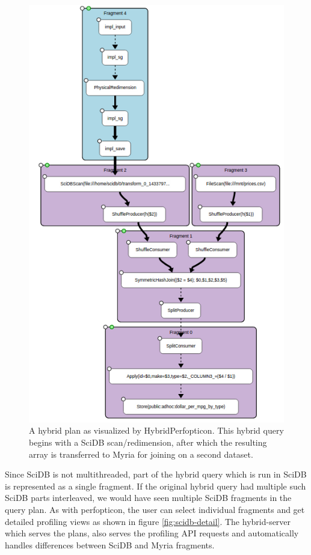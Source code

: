 \documentclass{chi2009}
\begin{document}
\begin{figure}[h]
\begin{center}
\includegraphics[scale=0.4]{visualization-example.png}
\end{center}
\caption{A hybrid plan as visualized by HybridPerfopticon.  This hybrid query begins with a SciDB scan/redimension, after which the resulting array is transferred to Myria for joining on a second dataset.}
\label{fig:hybrid-visualization}
\end{figure}
Since SciDB is not multithreaded, part of the hybrid query which is run in SciDB is represented as a single fragment. If the original hybrid query had multiple such SciDB parts interleaved, we would have seen multiple SciDB fragments in the query plan. As with perfopticon, the user can select individual fragments and get detailed profiling views as shown in figure \ref{fig:scidb-detail}. The hybrid-server which serves the plans, also serves the profiling API requests and automatically handles differences between SciDB and Myria fragments. 
\end{document}
